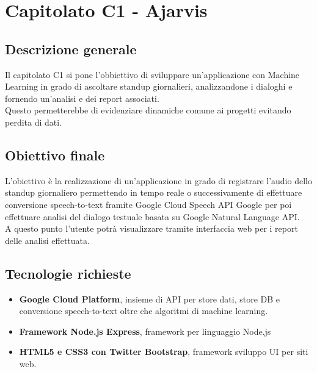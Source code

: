\documentclass[StudioDiFattibilità.tex]{subfiles}
\begin{document}
\chapter{Capitolato C1 - Ajarvis}
\section{Descrizione generale}
Il capitolato C1 si pone l'obbiettivo di sviluppare un'applicazione con Machine Learning in grado di ascoltare standup giornalieri, analizzandone i dialoghi e fornendo un'analisi e dei report associati.\\
Questo permetterebbe di evidenziare dinamiche comune ai progetti evitando perdita di dati.

\section{Obiettivo finale}
L’obiettivo è la realizzazione di un'applicazione in grado di registrare l'audio dello standup giornaliero permettendo in tempo reale o successivamente di effettuare conversione speech-to-text framite Google Cloud Speech API Google per poi effettuare analisi del dialogo testuale basata su Google Natural Language API.\\
A questo punto l'utente potrà visualizzare tramite interfaccia web per i report delle analisi effettuata. 

\section{Tecnologie richieste}
\begin{itemize}
	\item \textbf{Google Cloud Platform}, insieme di API per store dati, store DB e conversione speech-to-text oltre che algoritmi di machine learning.
	\item \textbf{ Framework Node.js Express}, framework per linguaggio Node.js 
	\item \textbf{ HTML5 e CSS3 con Twitter Bootstrap}, framework sviluppo UI per siti web.
\end{itemize}
\end{document}
